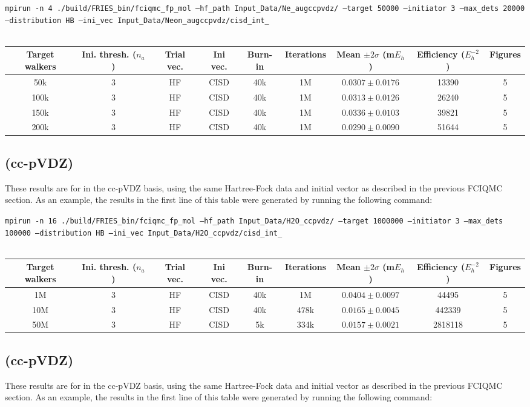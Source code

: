 \documentclass[12pt, landscape]{article}
\begin{document}
\texttt{mpirun -n 4 ./build/FRIES\_bin/fciqmc\_fp\_mol --hf\_path Input\_Data/Ne\_augccpvdz/ --target 50000 --initiator 3 --max\_dets 20000 --distribution HB --ini\_vec Input\_Data/Neon\_augccpvdz/cisd\_int\_}
\\~\\
\begin{tabular}{c|c|c|c|c|c|c|c|c}
Target walkers & Ini. thresh. ($n_a$) & Trial vec. & Ini vec. & Burn-in & Iterations & Mean $\pm 2 \sigma$ (m$E_h$) & Efficiency ($E_h^{-2}$) & Figures \\ \hline
50k & 3 & HF & CISD & 40k & 1M & $0.0307 \pm 0.0176$ & 13390 & 5 \\
100k & 3 & HF & CISD & 40k & 1M & $0.0313 \pm 0.0126$ & 26240 & 5 \\
150k & 3 & HF & CISD & 40k & 1M & $0.0336 \pm 0.0103$ & 39821 & 5 \\
200k & 3 & HF & CISD & 40k & 1M & $0.0290 \pm 0.0090$ & 51644 & 5 \\
\end{tabular}


\subsection*{ (cc-pVDZ)}
These results are for  in the cc-pVDZ basis, using the same Hartree-Fock data and initial vector as described in the previous FCIQMC section. As an example, the results in the first line of this table were generated by running the following command:

\texttt{mpirun -n 16 ./build/FRIES\_bin/fciqmc\_fp\_mol --hf\_path Input\_Data/H2O\_ccpvdz/ --target 1000000 --initiator 3 --max\_dets 100000 --distribution HB --ini\_vec Input\_Data/H2O\_ccpvdz/cisd\_int\_}
\\~\\
\begin{tabular}{c|c|c|c|c|c|c|c|c}
Target walkers & Ini. thresh. ($n_a$) & Trial vec. & Ini vec. & Burn-in & Iterations & Mean $\pm 2 \sigma$ (m$E_h$) & Efficiency ($E_h^{-2}$) & Figures \\ \hline
1M & 3 & HF & CISD & 40k & 1M & $0.0404 \pm 0.0097$ & 44495 & 5\\
10M & 3 & HF & CISD & 40k & 478k & $0.0165 \pm 0.0045$ & 442339 & 5\\
50M & 3 & HF & CISD & 5k & 334k & $0.0157 \pm 0.0021$ & 2818118 & 5 \\
\end{tabular}

\subsection*{ (cc-pVDZ)}
These results are for  in the cc-pVDZ basis, using the same Hartree-Fock data and initial vector as described in the previous FCIQMC section. As an example, the results in the first line of this table were generated by running the following command:
\end{document}
